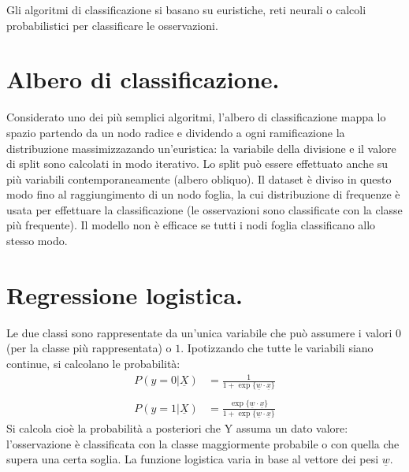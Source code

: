 \documentclass[11pt, a4page, twocolumn]{article}
\begin{document}
Gli algoritmi di classificazione si basano su euristiche, reti neurali o calcoli probabilistici per classificare le osservazioni.


\section{Albero di classificazione.}
Considerato uno dei più semplici algoritmi, l'albero di classificazione mappa lo spazio partendo da un nodo radice e dividendo a ogni ramificazione la distribuzione massimizzazando un'euristica: la variabile della divisione e il valore di split sono calcolati in modo iterativo.
Lo split può essere effettuato anche su più variabili contemporaneamente (albero obliquo).
Il dataset è diviso in questo modo fino al raggiungimento di un nodo foglia, la cui distribuzione di frequenze è usata per effettuare la classificazione (le osservazioni sono classificate con la classe più frequente).
Il modello non è efficace se tutti i nodi foglia classificano allo stesso modo.


\section{Regressione logistica.}
Le due classi sono rappresentate da un'unica variabile che può assumere i valori $0$ (per la classe più rappresentata) o $1$.
Ipotizzando che tutte le variabili siano continue, si calcolano le probabilità:
\begin{align*}
P(y=0 | \underline{X}) &= \frac{1}{1 + \exp{\{\underline{w} \cdot \underline{x}\}}} \\ \\
P(y=1 | \underline{X}) &= \frac{\exp{\{\underline{w} \cdot \underline{x}\}}}{1 + \exp{\{\underline{w} \cdot \underline{x}\}}}
\end{align*}
Si calcola cioè la probabilità a posteriori che Y assuma un dato valore: l'osservazione è classificata con la classe maggiormente probabile o con quella che supera una certa soglia.
La funzione logistica varia in base al vettore dei pesi $\underline{w}$.
\end{document}
